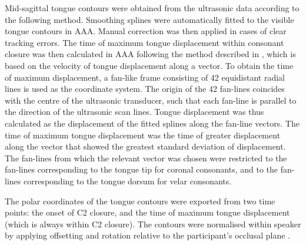 \documentclass[]{article}
\begin{document}
Mid-sagittal tongue contours were obtained from the ultrasonic data
according to the following method. Smoothing splines were automatically
fitted to the visible tongue contours in AAA. Manual correction was then
applied in cases of clear tracking errors. The time of maximum tongue
displacement within consonant closure was then calculated in AAA
following the method described in \citet{strycharczuk2015}, which is
based on the velocity of tongue displacement along a vector. To obtain
the time of maximum displacement, a fan-like frame consisting of 42
equidistant radial lines is used as the coordinate system. The origin of
the 42 fan-lines coincides with the centre of the ultrasonic transducer,
such that each fan-line is parallel to the direction of the ultrasonic
scan lines. Tongue displacement was thus calculated as the displacement
of the fitted splines along the fan-line vectors. The time of maximum
tongue displacement was the time of greater displacement along the
vector that showed the greatest standard deviation of displacement. The
fan-lines from which the relevant vector was chosen were restricted to
the fan-lines corresponding to the tongue tip for coronal consonants,
and to the fan-lines corresponding to the tongue dorsum for velar
consonants.

The polar coordinates of the tongue contours were exported from two time
points: the onset of C2 closure, and the time of maximum tongue
displacement (which is always within C2 closure). The contours were
normalised within speaker by applying offsetting and rotation relative
to the participant's occlusal plane \citep{scobbie2011}.


\end{document}
